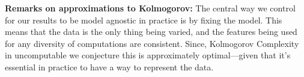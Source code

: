 \textbf{Remarks on approximations to Kolmogorov: }
The central way we control for our results to be model agnostic in practice is by fixing the model. 
This means that the data is the only thing being varied, and the features being used for any diversity of computations are consistent. 
Since, Kolmogorov Complexity in uncomputable we conjecture this is approximately optimal---given that it's essential in practice to have a way to represent the data. 


